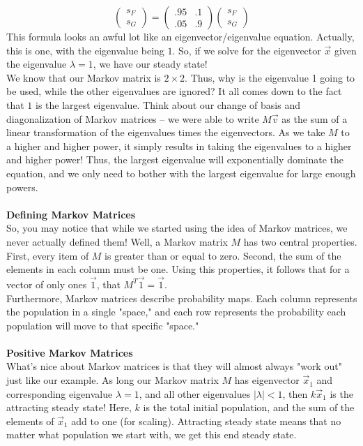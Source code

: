 \documentclass[12pt]{amsart}
\begin{document}
\[\begin{pmatrix}s_F\\s_G\end{pmatrix} = \begin{pmatrix}.95&.1\\.05&.9\end{pmatrix}\begin{pmatrix}s_F\\s_G\end{pmatrix}\]
This formula looks an awful lot like an eigenvector/eigenvalue equation. Actually, this is one, with the eigenvalue being $1$. So, if we solve for the eigenvector $\vec{x}$ given the eigenvalue $\lambda=1$, we have our steady state!\\
We know that our Markov matrix is $2 \times 2$. Thus, why is the eigenvalue 1 going to be used, while the other eigenvalues are ignored? It all comes down to the fact that $1$ is the largest eigenvalue. Think about our change of basis and diagonalization of Markov matrices -- we were able to write $M\vec{v}$ as the sum of a linear transformation of the eigenvalues times the eigenvectors. As we take $M$ to a higher and higher power, it simply results in taking the eigenvalues to a higher and higher power! Thus, the largest eigenvalue will exponentially dominate the equation, and we only need to bother with the largest eigenvalue for large enough powers.\\ \\
\textbf{Defining Markov Matrices}\\
So, you may notice that while we started using the idea of Markov matrices, we never actually defined them! Well, a Markov matrix $M$ has two central properties. First, every item of $M$ is greater than or equal to zero. Second, the sum of the elements in each column must be one. Using this properties, it follows that for a vector of only ones $\vec{1}$, that $M^T\vec{1} = \vec{1}$.\\
Furthermore, Markov matrices describe probability maps. Each column represents the population in a single "space," and each row represents the probability each population will move to that specific "space."
\\
\\
\textbf{Positive Markov Matrices}\\
What's nice about Markov matrices is that they will almost always "work out" just like our example. As long our Markov matrix $M$ has eigenvector $\vec{x}_1$ and corresponding eigenvalue $\lambda = 1$, and all other eigenvalues $|\lambda| < 1$, then $k\vec{x}_1$ is the attracting steady state! Here, $k$ is the total initial population, and the sum of the elements of $\vec{x}_1$ add to one (for scaling). Attracting steady state means that no matter what population we start with, we get this end steady state.\\
\end{document}
